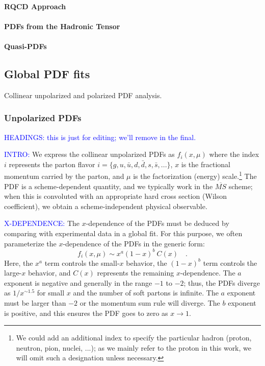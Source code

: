 \paragraph{RQCD Approach}

\paragraph{PDFs from the Hadronic Tensor}


\paragraph{Quasi-PDFs}





\subsection{Global PDF fits}

Collinear unpolarized and polarized PDF analysis.

\subsubsection{Unpolarized PDFs}




\textcolor{blue}{HEADINGS: this is just for editing; we'll remove in the final. }

\textcolor{blue}{INTRO:} 
We express the collinear unpolarized PDFs as $f_{i}(x,\mu)$
where the index $i$ represents the parton flavor $i=\{g,u,\bar{u},d,\bar{d},s,\bar{s},...\}$,
$x$ is the fractional momentum carried by the parton, and $\mu$
is the factorization (energy) scale.\footnote{We could add an additional index to specify the particular hadron
(proton, neutron, pion, nuclei, ...); as we mainly refer to the proton
in this work, we will omit such a designation unless necessary.} The PDF is a scheme-dependent quantity, and we typically work in
the $\overline{MS}$ scheme; when this is convoluted with an appropriate
hard cross section (Wilson coefficient), we obtain a scheme-independent
physical observable. 

\textcolor{blue}{X-DEPENDENCE:} 
The $x$-dependence of the PDFs must
be deduced by comparing with experimental data in a global fit. For
this purpose, we often parameterize the $x$-dependence of the PDFs
in the generic form: 
\begin{equation}
f_{i}(x,\mu)\sim x^{a}(1-x)^{b}\:C(x)\quad.
\end{equation}
Here, the $x^{a}$ term controls the small-$x$ behavior, the $(1-x)^{b}$
term controls the large-$x$ behavior, and $C(x)$ represents the
remaining $x$-dependence. The $a$ exponent is negative and generally
in the range $-1$ to $-2$; thus, the PDFs diverge as $1/x^{\sim1.5}$
for small $x$ and the number of soft partons is infinite. The $a$
exponent must be larger than $-2$ or the momentum sum rule will diverge.
The $b$ exponent is positive, and this ensures the PDF goes to zero
as $x\to1$.



